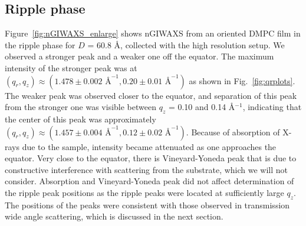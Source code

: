 \subsection{Ripple phase}\label{sec:nGIWAXS_ripple_phase}
Figure~\ref{fig:nGIWAXS_enlarge} shows nGIWAXS from an oriented DMPC film
in the ripple phase for $D$ = 60.8 \AA, collected with the high resolution setup. 
We observed a stronger peak and a weaker one off the equator. 
The maximum intensity of the stronger peak was at 
$(q_r, q_z) \approx (1.478 \pm 0.002 \text{ \AA}^{-1}, 0.20 \pm 0.01 \text{ \AA}^{-1})$ as shown
in Fig.~\ref{fig:qrplots}. The weaker peak was observed closer to the equator, and
separation of this peak from the stronger one was visible between 
$q_z$ = 0.10 and 0.14 \AA$^{-1}$, indicating that the center of this peak was approximately
$(q_r, q_z) \approx (1.457 \pm 0.004 \text{ \AA}^{-1}, 0.12 \pm 0.02 \text{ \AA}^{-1})$. 
Because of absorption of X-rays due to the sample, 
intensity became attenuated as one approaches the equator.
Very close to the equator, there is Vineyard-Yoneda 
peak that is due to constructive interference with scattering from the substrate,
which we will not consider.
Absorption and Vineyard-Yoneda peak did not affect determination of the 
ripple peak positions
as the ripple peaks were located at sufficiently large $q_z$. 
The positions of the peaks were consistent with those observed in 
transmission wide angle scattering, which is discussed in the next section.

